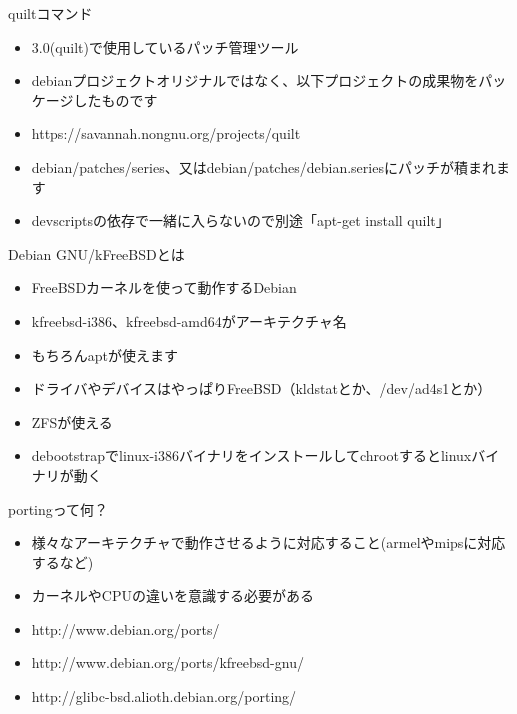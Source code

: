 \begin{frame}{quiltコマンド}
 \begin{itemize}
  \item 3.0(quilt)で使用しているパッチ管理ツール
  \item debianプロジェクトオリジナルではなく、以下プロジェクトの成果物をパッケージしたものです
  \item https://savannah.nongnu.org/projects/quilt
  \item debian/patches/series、又はdebian/patches/debian.seriesにパッチが積まれます
  \item devscriptsの依存で一緒に入らないので別途「apt-get install quilt」
 \end{itemize}
\end{frame}


\begin{frame}{Debian GNU/kFreeBSDとは}
 \begin{itemize}
  \item FreeBSDカーネルを使って動作するDebian
  \item kfreebsd-i386、kfreebsd-amd64がアーキテクチャ名
  \item もちろんaptが使えます
  \item ドライバやデバイスはやっぱりFreeBSD（kldstatとか、/dev/ad4s1とか）
  \item ZFSが使える
  \item debootstrapでlinux-i386バイナリをインストールしてchrootするとlinuxバイナリが動く
 \end{itemize}
\end{frame}

\begin{frame}{portingって何？}
 \begin{itemize}
  \item 様々なアーキテクチャで動作させるように対応すること(armelやmipsに対応するなど)
  \item カーネルやCPUの違いを意識する必要がある
  \item http://www.debian.org/ports/
  \item http://www.debian.org/ports/kfreebsd-gnu/
  \item http://glibc-bsd.alioth.debian.org/porting/
 \end{itemize}
\end{frame}

